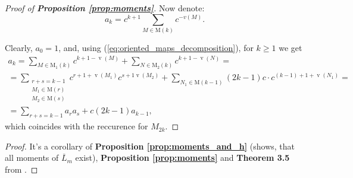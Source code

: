 \documentclass{article}
\begin{document}
\begin{proof}[Proof of \textbf{Proposition \ref{prop:moments}}]
    Now denote:
    $$
        a_k = c^{k + 1}\sum\limits_{M \in \mathrm{M}(k)}c^{-v(M)}.
    $$
    
    Clearly, $a_0 = 1$, and, using (\ref{eq:oriented_maps_decomposition}), for $k \geq 1$ we get
    \begin{multline}
		a_k = \sum\limits_{M \in \mathrm{M_1}(k)}c^{k + 1 - \mathop{v}(M)} + \sum\limits_{N \in \mathrm{M_2}(k)}c^{k + 1 - \mathop{v}(N)} = \\
		 = \sum\limits_{\substack{r + s = k - 1 \\ M_1 \in \mathrm{M}(r) \\ M_2 \in \mathrm{M}(s)}}c^{r + 1 + \mathop{v}(M_1)}c^{s + 1 \mathop{v}(M_2)} + \sum\limits_{N_1 \in \mathrm{M}(k - 1)}(2k - 1)c\cdot c^{(k - 1) + 1 + \mathop{v}(N_1)} = \\
		 = \sum\limits_{r + s = k - 1}a_ra_s + c(2k - 1)a_{k - 1},
    \end{multline}
    which coincides with the reccurence for $M_{2k}$.
\end{proof}

\begin{proof}
	It's a corollary of \textbf{Proposition \ref{prop:moments_and_h}} (shows, that all moments of $\overline{L}_m$ exist), \textbf{Proposition \ref{prop:moments}} and \textbf{Theorem 3.5} from \cite{randmatrgeneral}.
\end{proof}
\end{document}
